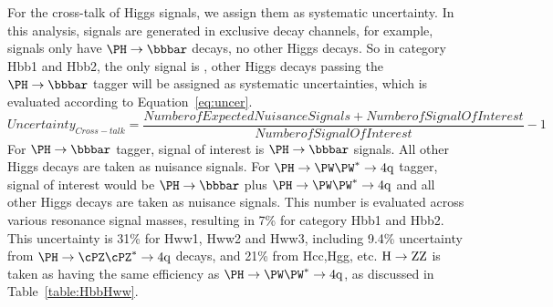 For the cross-talk of Higgs signals, we assign them as systematic uncertainty. 
In this analysis, signals are generated in exclusive decay channels, for example, \HbbVqq signals only have 
$\Hbb$ decays, no other Higgs decays. 
So in category Hbb1 and Hbb2,  the only signal is \HbbVqq, other Higgs decays passing the $\Hbb$ tagger will 
be assigned as systematic uncertainties, which is evaluated according to Equation~\ref{eq:uncer}. 
\begin{equation}
Uncertainty_{Cross-talk} = \frac{NumberofExpectedNuisanceSignals+NumberofSignalOfInterest}{NumberofSignalOfInterest} - 1 
\label{eq:uncer}
\end{equation}
\noindent For $\Hbb$ tagger, signal of interest is $\Hbb$ signals. All other Higgs decays are taken as nuisance signals.
For $\Hww$ tagger,  signal of interest would be $\Hbb$ plus $\Hww$ and all other Higgs decays are taken as 
nuisance signals.  This number is evaluated across various resonance signal masses, resulting in 7\% for category Hbb1
and Hbb2. This uncertainty is 31\% for Hww1, Hww2 and Hww3, including 9.4\% uncertainty from $\Hzz$ decays, and 21\% from 
Hcc,Hgg, etc.  ${\rm H \to ZZ}$ is taken as having the same efficiency as $\Hww$, as discussed in Table~\ref{table:HbbHww}.   


